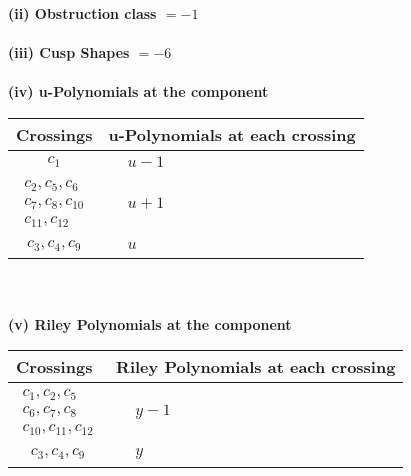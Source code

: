 \documentclass[1p]{elsarticle_modified}
\theoremstyle{definition}
\begin{document}
\flushleft \textbf{(ii) Obstruction class $= -1$}\\~\\
\flushleft \textbf{(iii) Cusp Shapes $= -6$}\\~\\
\newpage\renewcommand{\arraystretch}{1}
\flushleft \textbf{(iv) u-Polynomials at the component}\newline \\
\begin{tabular}{m{50pt}|m{274pt}}
Crossings & \hspace{64pt}u-Polynomials at each crossing \\
\hline $$\begin{aligned}c_{1}\end{aligned}$$&$\begin{aligned}
&u-1
\end{aligned}$\\
\hline $$\begin{aligned}c_{2},c_{5},c_{6}\\c_{7},c_{8},c_{10}\\c_{11},c_{12}\end{aligned}$$&$\begin{aligned}
&u+1
\end{aligned}$\\
\hline $$\begin{aligned}c_{3},c_{4},c_{9}\end{aligned}$$&$\begin{aligned}
&u
\end{aligned}$\\
\hline
\end{tabular}\\~\\
\newpage\renewcommand{\arraystretch}{1}
\flushleft \textbf{(v) Riley Polynomials at the component}\newline \\
\begin{tabular}{m{50pt}|m{274pt}}
Crossings & \hspace{64pt}Riley Polynomials at each crossing \\
\hline $$\begin{aligned}c_{1},c_{2},c_{5}\\c_{6},c_{7},c_{8}\\c_{10},c_{11},c_{12}\end{aligned}$$&$\begin{aligned}
&y-1
\end{aligned}$\\
\hline $$\begin{aligned}c_{3},c_{4},c_{9}\end{aligned}$$&$\begin{aligned}
&y
\end{aligned}$\\
\hline
\end{tabular}\\~\\
\end{document}
